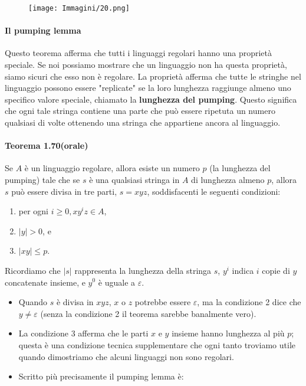 \documentclass{article}
\begin{document}
\begin{figure}[H]
    \centering
    \texttt{[image: Immagini/20.png]}
    \label{fig:your_image}
\end{figure}

\paragraph{Il pumping lemma}
\vspace{1em}
\text{}
\newline
Questo teorema afferma che tutti i linguaggi regolari hanno una proprietà speciale. Se noi possiamo mostrare che un linguaggio non ha questa proprietà, siamo sicuri che esso non è regolare. La proprietà afferma che tutte le stringhe nel linguaggio possono essere "replicate" se la loro lunghezza raggiunge almeno uno specifico valore speciale, chiamato la \textbf{lunghezza del pumping}. Questo significa che ogni tale stringa contiene una parte che può essere ripetuta un numero qualsiasi di volte ottenendo una stringa che appartiene ancora al linguaggio.

\paragraph{Teorema 1.70(orale)}
\label{teorema-1.70}
\text{}
\begin{tcolorbox}[colback=green!10!white, colframe=green!50!black, title=Teorema 1.70]
    Se $A$ è un linguaggio regolare, allora esiste un numero $p$ (la lunghezza del pumping) tale che se $s$ è una qualsiasi stringa in $A$ di lunghezza almeno $p$, allora $s$ può essere divisa in tre parti, $s = xyz$, soddisfacenti le seguenti condizioni:
    \begin{enumerate}
        \item per ogni $i \geq 0, xy^{i}z \in A$,
        \item $|y| > 0$, e
        \item $|xy| \leq p$.
    \end{enumerate}
\end{tcolorbox}

\begin{tcolorbox}[colback=red!10!white, colframe=red!50!black, title=IMPORTANTE!]
    Ricordiamo che $|s|$ rappresenta la lunghezza della stringa $s$, $y^{i}$ indica $i$ copie di $y$ concatenate insieme, e $y^{0}$ è uguale a $\varepsilon$.
\end{tcolorbox}

\begin{itemize}
    \item Quando $s$ è divisa in $xyz$, $x$ o $z$ potrebbe essere $\varepsilon$, ma la condizione 2 dice che $y \neq \varepsilon$ (senza la condizione 2 il teorema sarebbe banalmente vero).
    \item La condizione 3 afferma che le parti $x$ e $y$ insieme hanno lunghezza al più $p$; questa è una condizione tecnica supplementare che ogni tanto troviamo utile quando dimostriamo che alcuni linguaggi non sono regolari.
    \item Scritto più precisamente il pumping lemma è:
\end{itemize}
\vspace{1em}
\end{document}
